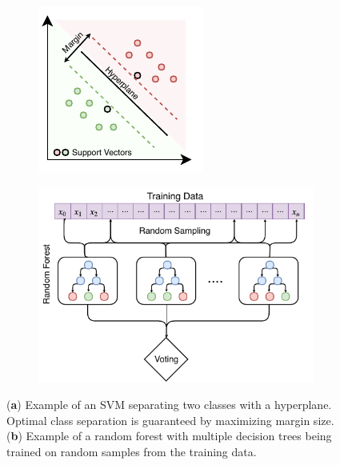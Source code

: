 \begin{figure}[h]
\centering
   \begin{subfigure}[b]{0.40\textwidth}
   \includegraphics[trim={0cm 0cm 0cm 0cm},clip,width=.90\linewidth]{chapter_4_roofshape/imgs/svm_no_kernel.pdf}
   \caption{}
   \label{fig:svm_vis} 
\end{subfigure}
\begin{subfigure}[b]{.50\columnwidth}
   \includegraphics[trim={0.1cm 0cm 0cm 0.5cm},clip,width=.99\linewidth]{chapter_4_roofshape/imgs/random_forest_vis.pdf}
   \caption{}
   \label{fig:random_forest_vis}
\end{subfigure}
\vspace{-12pt}

\caption[SVM and Random Forest]{(\textbf{a}) Example of an SVM separating two classes with a hyperplane. Optimal class separation is guaranteed by maximizing margin size. (\textbf{b}) Example of a random forest with multiple decision trees being trained on random samples from the training data. }
\label{fig:vis_classical}
\end{figure}

